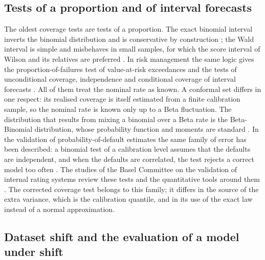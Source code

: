 \subsection{Tests of a proportion and of interval forecasts}

The oldest coverage tests are tests of a proportion. The exact binomial interval inverts the binomial distribution and is conservative by construction \citep{clopper1934}; the Wald interval is simple and misbehaves in small samples, for which the score interval of Wilson and its relatives are preferred \citep{wilson1927,brown2001}. In risk management the same logic gives the proportion-of-failures test of value-at-risk exceedances \citep{kupiec1995} and the tests of unconditional coverage, independence and conditional coverage of interval forecasts \citep{christoffersen1998}. All of them treat the nominal rate as known. A conformal set differs in one respect: its realised coverage is itself estimated from a finite calibration sample, so the nominal rate is known only up to a Beta fluctuation. The distribution that results from mixing a binomial over a Beta rate is the Beta-Binomial distribution, whose probability function and moments are standard \citep{johnson2005}. In the validation of probability-of-default estimates the same family of error has been described: a binomial test of a calibration level assumes that the defaults are independent, and when the defaults are correlated, the test rejects a correct model too often \citep{tasche2008}. The studies of the Basel Committee on the validation of internal rating systems review these tests and the quantitative tools around them \citep{bcbswp14}. The corrected coverage test belongs to this family; it differs in the source of the extra variance, which is the calibration quantile, and in its use of the exact law instead of a normal approximation.

\subsection{Dataset shift and the evaluation of a model under shift}

